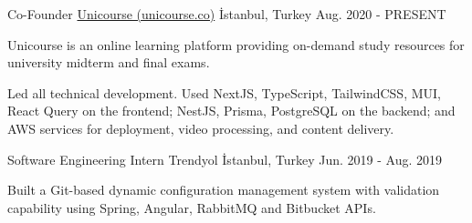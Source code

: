 
\vspace*{-1.5mm}
\begin{cventries}

  \cventry
    {Co-Founder}
    {\href{https://unicourse.co}{Unicourse (unicourse.co)}}
    {İstanbul, Turkey}
    {Aug. 2020 - PRESENT}
    {
      \begin{cvitems}
        \item {Unicourse is an online learning platform providing on-demand study resources for university midterm and final exams.}
        \item {Led all technical development. Used NextJS, TypeScript, TailwindCSS, MUI, React Query on the frontend; NestJS, Prisma, PostgreSQL on the backend; and AWS services for deployment, video processing, and content delivery.}
      \end{cvitems}
    }

  \cventry
    {Software Engineering Intern}
    {Trendyol}
    {İstanbul, Turkey}
    {Jun. 2019 - Aug. 2019}
    {
      \begin{cvitems}
        \item {Built a Git-based dynamic configuration management system with validation capability using Spring, Angular, RabbitMQ and Bitbucket APIs.}
      \end{cvitems}
    }
\end{cventries}
